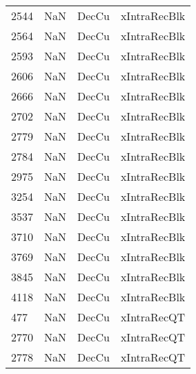 \begin{tabular}{llll}
2544 &                   NaN &                      DecCu &                              xIntraRecBlk \\
2564 &                   NaN &                      DecCu &                              xIntraRecBlk \\
2593 &                   NaN &                      DecCu &                              xIntraRecBlk \\
2606 &                   NaN &                      DecCu &                              xIntraRecBlk \\
2666 &                   NaN &                      DecCu &                              xIntraRecBlk \\
2702 &                   NaN &                      DecCu &                              xIntraRecBlk \\
2779 &                   NaN &                      DecCu &                              xIntraRecBlk \\
2784 &                   NaN &                      DecCu &                              xIntraRecBlk \\
2975 &                   NaN &                      DecCu &                              xIntraRecBlk \\
3254 &                   NaN &                      DecCu &                              xIntraRecBlk \\
3537 &                   NaN &                      DecCu &                              xIntraRecBlk \\
3710 &                   NaN &                      DecCu &                              xIntraRecBlk \\
3769 &                   NaN &                      DecCu &                              xIntraRecBlk \\
3845 &                   NaN &                      DecCu &                              xIntraRecBlk \\
4118 &                   NaN &                      DecCu &                              xIntraRecBlk \\
477  &                   NaN &                      DecCu &                               xIntraRecQT \\
2770 &                   NaN &                      DecCu &                               xIntraRecQT \\
2778 &                   NaN &                      DecCu &                               xIntraRecQT \\

\end{tabular}

